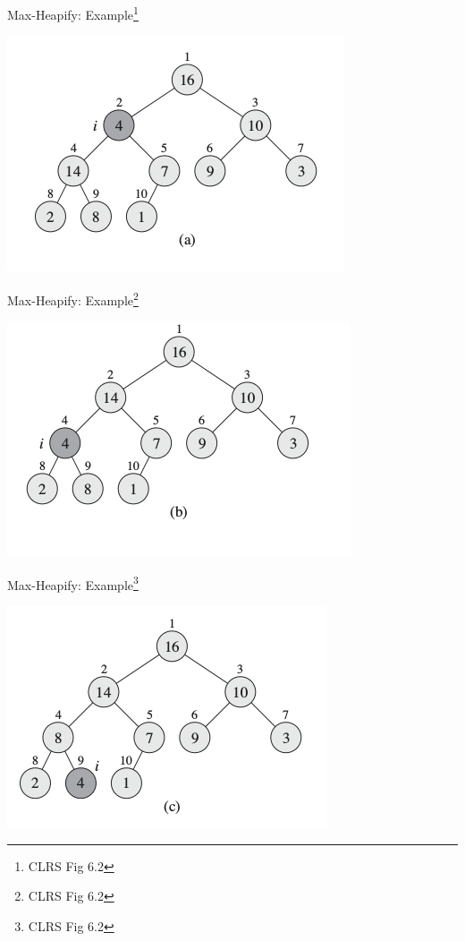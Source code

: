 \documentclass{beamer}
\begin{document}
\begin{frame}{Max-Heapify: Example\footnote{CLRS Fig 6.2}}
    \begin{center}
        \includegraphics[scale=0.6]{maxHeapify1.png}
    \end{center}
\end{frame}


\begin{frame}{Max-Heapify: Example\footnote{CLRS Fig 6.2}}
    \begin{center}
        \includegraphics[scale=0.6]{maxHeapify2.png}
    \end{center}
\end{frame}


\begin{frame}{Max-Heapify: Example\footnote{CLRS Fig 6.2}}
    \begin{center}
        \includegraphics[scale=0.6]{maxHeapify3.png}
    \end{center}
\end{frame}
\end{document}
